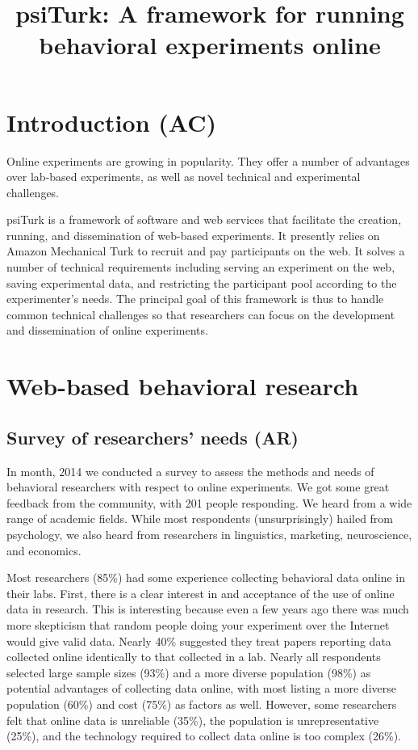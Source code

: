 \documentclass[jou,apacite]{apa6}
\title{psiTurk: A framework for running behavioral experiments online}
\begin{document}
\maketitle
\section{Introduction (AC)}

Online experiments are growing in popularity. 
They offer a number of advantages over lab-based experiments, as well as novel technical and experimental challenges.

psiTurk is a framework of software and web services that facilitate the creation, running, and dissemination of web-based experiments.
It presently relies on Amazon Mechanical Turk to recruit and pay participants on the web.
It solves a number of technical requirements including serving an experiment on the web, saving experimental data, and restricting the participant pool according to the experimenter's needs.
The principal goal of this framework is thus to handle common technical challenges so that researchers can focus on the development and dissemination of online experiments.

\section{Web-based behavioral research}

\subsection{Survey of researchers' needs (AR)}

In month, 2014 we conducted a survey to assess the methods and needs of behavioral researchers with respect to online experiments.
We got some great feedback from the community, with 201 people responding.
We heard from a wide range of academic fields.
While most respondents (unsurprisingly) hailed from psychology, we also heard from researchers in linguistics, marketing, neuroscience, and economics.

Most researchers (85\%) had some experience collecting behavioral data online in their labs.
 First, there is a clear interest in and acceptance of the use of online data in research.
This is interesting because even a few years ago there was much more skepticism that random people doing your experiment over the Internet would give valid data.
Nearly 40\% suggested they treat papers reporting data collected online identically to that collected in a lab.
Nearly all respondents selected large sample sizes (93\%) and a more diverse population (98\%) as potential advantages of collecting data online, with most listing a more diverse population (60\%) and cost (75\%) as factors as well.
However, some researchers felt that online data is unreliable (35\%), the population is unrepresentative (25\%), and the technology required to collect data online is too complex (26\%).
\end{document}
